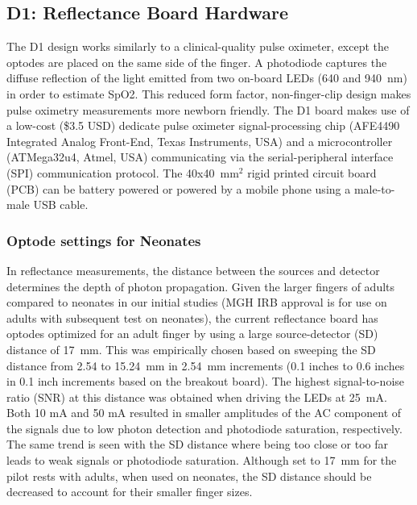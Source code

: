     \subsection{D1: Reflectance Board Hardware}
    The D1 design works similarly to a clinical-quality pulse oximeter, except the optodes are placed on the same side of the finger. A photodiode captures the diffuse reflection of the light emitted from two on-board LEDs (640 and 940~nm) in order to estimate SpO2. This reduced form factor, non-finger-clip design makes pulse oximetry measurements more newborn friendly. The D1 board makes use of a low-cost (\$3.5 USD) dedicate pulse oximeter signal-processing chip (AFE4490 Integrated Analog Front-End, Texas Instruments, USA) and a microcontroller (ATMega32u4, Atmel, USA) communicating via the serial-peripheral interface (SPI) communication protocol. The 40x40~mm$^2$ rigid printed circuit board (PCB) can be battery powered or powered by a mobile phone using a male-to-male USB cable. 
    
        \subsubsection{Optode settings for Neonates}
        In reflectance measurements, the distance between the sources and detector determines the depth of photon propagation. Given the larger fingers of adults compared to neonates in our initial studies (MGH IRB approval is for use on adults with subsequent test on neonates), the current reflectance board has optodes optimized for an adult finger by using a large source-detector (SD) distance of 17~mm. This was empirically chosen based on sweeping the SD distance from 2.54 to 15.24~mm in 2.54~mm increments (0.1 inches to 0.6 inches in 0.1 inch increments based on the breakout board). The highest signal-to-noise ratio (SNR) at this distance was obtained when driving the LEDs at 25~mA. Both 10 mA and 50 mA resulted in smaller amplitudes of the AC component of the signals due to low photon detection and photodiode saturation, respectively. The same trend is seen with the SD distance where being too close or too far leads to weak signals or photodiode saturation. Although set to 17~mm for the pilot rests with adults, when used on neonates, the SD distance should be decreased to account for their smaller finger sizes. 

